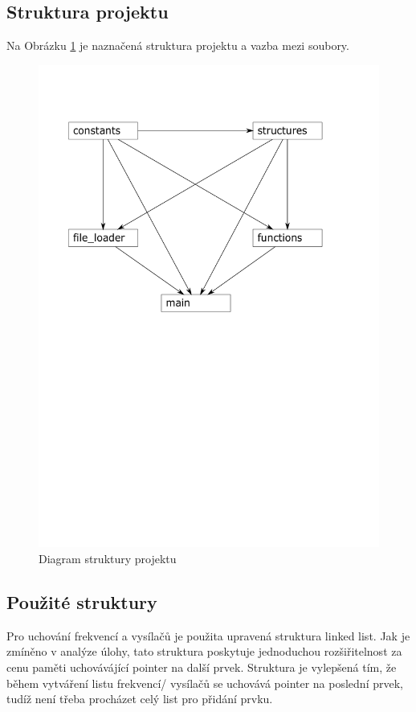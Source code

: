 \documentclass[12pt]{article}
\begin{document}
\subsection{Struktura projektu}
%
Na Obrázku \ref{img:structure} je naznačená struktura projektu a vazba mezi soubory.
%
\begin{figure}[H]
        \centering
        \includegraphics[width=\textwidth, trim={0 14cm 0 0}]{img/project_diagram.pdf}
        \caption{Diagram struktury projektu}
        \label{img:structure}
\end{figure}
%
\subsection{Použité struktury}
%
Pro uchování frekvencí a vysílačů je použita upravená struktura linked list.
Jak je zmíněno v analýze úlohy, tato struktura poskytuje jednoduchou
rozšiřitelnost za cenu paměti uchovávájící pointer na další prvek. Struktura
je vylepšená tím, že během vytváření listu frekvencí/ vysílačů se uchovává 
pointer na poslední prvek, tudíž není třeba procházet celý list pro přidání
prvku.\\
\end{document}
